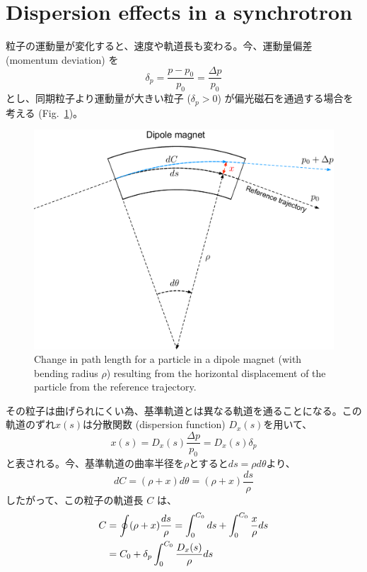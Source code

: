 \documentclass[10pt,a4paper]{ltjsarticle}
\begin{document}
\section{Dispersion effects in a synchrotron}
粒子の運動量が変化すると、速度や軌道長も変わる。今、運動量偏差 (momentum deviation) を
%
\begin{equation}
    \delta_p = \frac{p-p_0}{p_0}=\frac{\Delta p}{p_0}
\end{equation}
%
とし、同期粒子より運動量が大きい粒子 ($\delta_p >0$) が偏光磁石を通過する場合を考える (Fig.~\ref{dispersion})。
%
\begin{figure}[hbt]
    \begin{center}
      \includegraphics[width=15cm,clip]{dispersion.pdf}
      \caption{Change in path length for a particle in a dipole magnet (with bending radius $\rho$) resulting from the horizontal displacement of the particle from the reference trajectory.}
      \label{dispersion}
    \end{center}
\end{figure}
%
その粒子は曲げられにくい為、基準軌道とは異なる軌道を通ることになる。この軌道のずれ$x(s)$は分散関数 (dispersion function) $D_x(s)$を用いて、
%
\begin{equation}
    x(s) = D_x(s)\frac{\Delta p}{p_0} = D_x(s)\delta_p 
\end{equation}
%
と表される。今、基準軌道の曲率半径を$\rho$とすると$ds = \rho d\theta$より、
%
\begin{equation}
    dC = (\rho + x) d\theta = (\rho + x) \frac{ds}{\rho}
\end{equation}
%
したがって、この粒子の軌道長 $C$ は、
%
\begin{align}
    C &= \oint (\rho + x)\frac{ds}{\rho} = \int_0^{C_0} ds + \int_0^{C_0}\frac{x}{\rho} ds \notag \\
    &= C_0 + \delta_p \int_0^{C_0}\frac{D_x(s)}{\rho} ds
\end{align}
\end{document}
